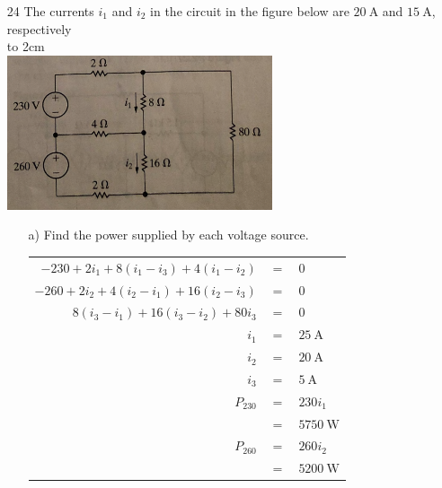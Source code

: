 \documentclass[a4paper]{article}
\begin{document}
\begin{itemize}
\begin{itemize}
\begin{tabular}{r c l}
	      	      \end{tabular} 
	      \end{itemize}
	\item[24] The currents $i_{1}$ and $i_{2}$ in the circuit in the figure below are $\SI{20}{\ampere}$ and $\SI{15}{\ampere}$, respectively \\
	      \hbox to 2cm{} \\	  
	      \includegraphics{P2-24.png} \\	  
	      \begin{itemize}
	      	\item[a)] Find the power supplied by each voltage source. \\
	      	      \begin{tabular}{r c l}
	      	      	$-230 + 2i_{1} + 8(i_{1} - i_{3}) + 4(i_{1} - i_{2})$  & $=$ & $0$                \\
	      	      	$-260 + 2i_{2} + 4(i_{2} - i_{1}) + 16(i_{2} - i_{3})$ & $=$ & $0$                \\
	      	      	$8(i_{3} - i_{1}) + 16(i_{3} - i_{2}) + 80i_{3}$       & $=$ & $0$                \\
	      	      	$i_{1}$                                                & $=$ & $\SI{25}{\ampere}$ \\
	      	      	$i_{2}$                                                & $=$ & $\SI{20}{\ampere}$ \\
	      	      	$i_{3}$                                                & $=$ & $\SI{5}{\ampere}$  \\
	      	      	$P_{230}$                                              & $=$ & $230i_{1}$         \\
	      	      	                                                       & $=$ & $\SI{5750}{\watt}$ \\
	      	      	$P_{260}$                                              & $=$ & $260i_{2}$         \\
	      	      	                                                       & $=$ & $\SI{5200}{\watt}$ \\

\end{tabular}
\end{itemize}
\end{itemize}
\end{document}

